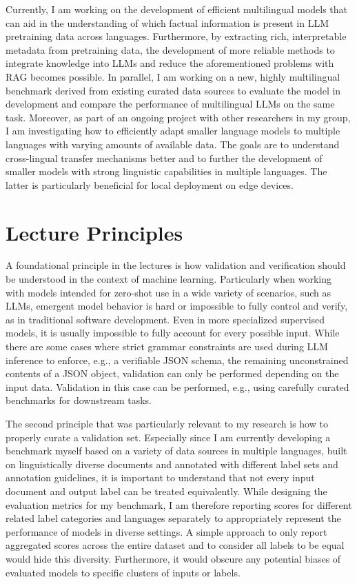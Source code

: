 \documentclass[11pt]{article}
\begin{document}
Currently, I am working on the development of efficient multilingual models that can aid in the understanding of which factual information is present in LLM pretraining data across languages. Furthermore, by extracting rich, interpretable metadata from pretraining data, the development of more reliable methods to integrate knowledge into LLMs and reduce the aforementioned problems with RAG becomes possible.
In parallel, I am working on a new, highly multilingual benchmark derived from existing curated data sources to evaluate the model in development and compare the performance of multilingual LLMs on the same task. Moreover, as part of an ongoing project with other researchers in my group, I am investigating how to efficiently adapt smaller language models to multiple languages with varying amounts of available data. The goals are to understand cross-lingual transfer mechanisms better and to further the development of smaller models with strong linguistic capabilities in multiple languages. The latter is particularly beneficial for local deployment on edge devices.

\section{Lecture Principles}

A foundational principle in the lectures is how validation and verification should be understood in the context of machine learning. Particularly when working with models intended for zero-shot use in a wide variety of scenarios, such as LLMs, emergent model behavior is hard or impossible to fully control and verify, as in traditional software development. Even in more specialized supervised models, it is usually impossible to fully account for every possible input. While there are some cases where strict grammar constraints are used during LLM inference to enforce, e.g., a verifiable JSON schema, the remaining unconstrained contents of a JSON object, validation can only be performed depending on the input data. Validation in this case can be performed, e.g., using carefully curated benchmarks for downstream tasks.

The second principle that was particularly relevant to my research is how to properly curate a validation set. Especially since I am currently developing a benchmark myself based on a variety of data sources in multiple languages, built on linguistically diverse documents and annotated with different label sets and annotation guidelines, it is important to understand that not every input document and output label can be treated equivalently. While designing the evaluation metrics for my benchmark, I am therefore reporting scores for different related label categories and languages separately to appropriately represent the performance of models in diverse settings. A simple approach to only report aggregated scores across the entire dataset and to consider all labels to be equal would hide this diversity. Furthermore, it would obscure any potential biases of evaluated models to specific clusters of inputs or labels.
\end{document}
